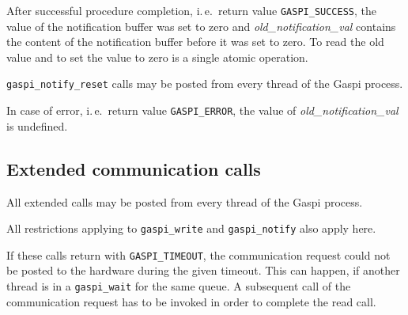 \documentclass[a4paper]{article}
\makeatletter
\newlength{\st}\setlength{\st}{0pt}
\newcommand{\zsep}[1]{#1}
\newcommand{\gaspiprefix}{gaspi}
\newcommand{\GASPI}{{\sc Gaspi}}
\newcommand{\function}[1]{{\tt #1}}
\newcommand{\parameter}[1]{{\it #1}}
\newcommand{\gaspifunction}[1]{\function{\protect\zsep{\gaspiprefix\_#1}}}
\newcounter{counttodo}
\newlength{\savetabcolsep}
\newlength{\savearrayrulewidth}
\newenvironment{todo}
{\stepcounter{counttodo}
 \typeout{Environment TODO call \thecounttodo}
 \setlength{\savetabcolsep}{\tabcolsep}
 \setlength{\savearrayrulewidth}{\arrayrulewidth}
 \renewcommand{\tabcolsep}{0pt}
 \renewcommand{\arrayrulewidth}{2pt}
 \begin{center}
 \begin{tabular}{c|l@{\hspace*{2em}}|@{\hspace*{2em}}c}
 &
 \begin{minipage}{0.66\textwidth}
 \begin{itemize}
}
{\end{itemize}
 \end{minipage}
 &  todo \#\thecounttodo
 \end{tabular} \marginpar{$\Longleftarrow$}
 \end{center}
 \renewcommand{\tabcolsep}{\savetabcolsep}
 \renewcommand{\arrayrulewidth}{\savearrayrulewidth}
}
\newcommand{\GASPISUCC}{{\tt\protect\zsep{GASPI\_SUCCESS}}}
\newcommand{\GASPITIME}{{\tt\protect\zsep{GASPI\_TIMEOUT}}}
\newcommand{\GASPIGERR}{{\tt\protect\zsep{GASPI\_ERROR}}}
\makeatother
\begin{document}
After successful procedure completion, i.\,e.\ return value
\GASPISUCC{}, the value of the notification buffer was set to zero and
\parameter{old\_notification\_val} contains the content of the notification buffer
before it was set to zero. To read the old value and to set the value
to zero is a single atomic operation.

\gaspifunction{notify\_reset} calls may be posted from every thread of
the \GASPI{} process.

In case of error, i.\,e.\ return value \GASPIGERR, the value of
\parameter{old\_notification\_val} is undefined.





%
%

\subsection{Extended communication calls}

All extended calls may be posted from every thread of the \GASPI{} process.

All restrictions applying to \gaspifunction{write} and
\gaspifunction{notify} also apply here. 

If these calls return with \GASPITIME{}, the communication request could not be posted
to the hardware during the given timeout. This can happen, if another thread is in a \gaspifunction{wait}
for the same queue. A subsequent call of the communication request has to be
invoked in order to complete the read call.
\end{document}
